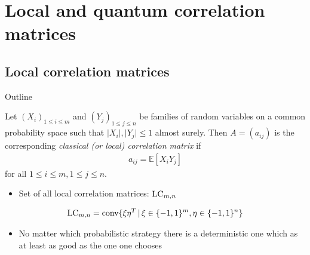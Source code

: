\section{Local and quantum correlation matrices}
\subsection{Local correlation matrices }
\begin{frame}{Outline}
\tableofcontents[currentsection]
\end{frame}
\begin{frame}
	\begin{definition}
		Let $ (X_i)_{1 \le i \le m } $ and $ (Y_j)_{1 \le j \le n} $ be families of random variables on a common probability space such that $ \vert X_i \vert, \vert Y_j \vert \le 1 $ almost surely. Then $ A=(a_{ij}) $ is the corresponding {\itshape classical (or local) correlation matrix} if 
		\begin{align*}
		a_{ij} = \mathbb{E}[X_iY_j]
		\end{align*}
		for all $ 1 \le i \le m, 1 \le j \le n $.
	\end{definition}
	\pause
	\begin{itemize}
		\item Set of all local correlation matrices: $ \textup{LC}_{m,n} $
	\end{itemize}
	\pause
	\begin{lemma}
		\begin{align*}
			\textup{LC}_{m,n} = \textup{conv} \{  \xi\eta^T \, | \, \xi \in \{-1,1\}^m, \eta \in \{-1,1\}^n     \}
		\end{align*}
		
	\end{lemma}
	\begin{itemize}
		\item No matter which probabilistic strategy there is a deterministic one which as at least as good as the one one chooses 
	\end{itemize}
\end{frame}
